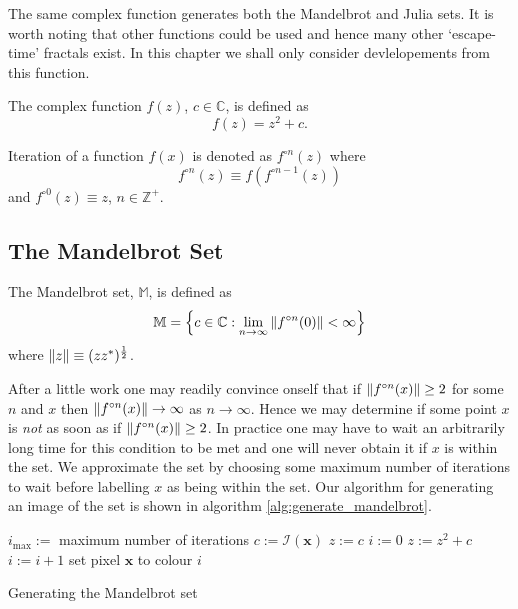 The same complex function generates both the Mandelbrot and
Julia sets\cite{FRAC:Mandelbrot, FRAC:JuliaMandelBook}. It is worth noting
that other functions could be used and hence many other `escape-time' fractals
exist. In this chapter we shall only consider devlelopements from this function.

\begin{definition}
The complex function $f(z)$, $c \in {\mathbb C}$,
    is defined as
\[
f(z) = z^2 + c.
\]
\end{definition}

\begin{definition}[Iteration]
Iteration of a function $f(x)$ is denoted as $f^{\circ n}(z)$ where
\[
f^{\circ n}(z) \equiv f(f^{\circ n-1}(z))
\]
and $f^{\circ 0}(z) \equiv z$, $n \in {\mathbb Z}^+$.
\end{definition}

\subsection{The Mandelbrot Set}

\begin{definition}
The Mandelbrot set, $\mathbb{M}$, is defined as
\[
\mathbb{M} = 
\left\{c \in \mathbb{C} 
: \lim_{n \rightarrow \infty} \left\Vert f^{\circ n}(0) \right\Vert < \infty \right\} 
\]
where $\left\Vert z \right\Vert \equiv (zz^*)^\frac{1}{2}$.
\end{definition}

After a little work one may readily convince onself that if $\left\Vert f^{\circ n}(x) \right\Vert \ge 2$
for some $n$ and $x$ then $\left\Vert f^{\circ n}(x) \right\Vert \rightarrow \infty$ as $n \rightarrow \infty$.
Hence we may determine if some point $x$ is \emph{not} as soon as if $\left\Vert f^{\circ n}(x) \right\Vert \ge 2$. 
In practice one may have to wait an arbitrarily long time for this condition to be met
and one will never obtain it if $x$ is within the set. We approximate the
set by choosing some maximum number of iterations to wait before labelling
$x$ as being within the set.
Our algorithm for generating an image of the
set is shown in algorithm \ref{alg:generate_mandelbrot}.

\begin{fancyalg}
\begin{algorithmic}[1]
\STATE $i_{\mathrm{max}} :=$ maximum number of iterations
\STATE $c := {\mathcal I}(\mathbf{x})$
\STATE $z := c$
\STATE $i := 0$
  \STATE $z := z^2 + c$
  \STATE $i := i+1$
\ENDWHILE 
\STATE set pixel $\mathbf{x}$ to colour $i$
\ENDFOR
\end{algorithmic}
\caption{
\label{alg:generate_mandelbrot}
  Generating the Mandelbrot set}
\end{fancyalg}

